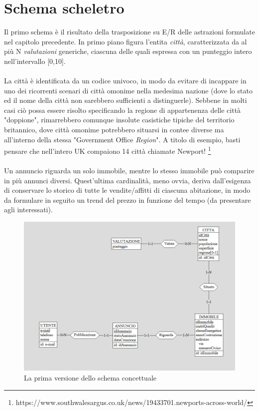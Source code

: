 \documentclass[a4paper,12pt]{report}
\begin{document}
        \section{Schema scheletro}
        Il primo schema è il risultato della trasposizione su E/R delle astrazioni formulate nel capitolo precedente.
        In primo piano figura l'entita \textit{città}, caratterizzata da al più N \textit{valutazioni} generiche,
        ciascuna delle quali espressa con un punteggio intero nell'intervallo [0,10]. \\
        \\
        La città è identificata da un codice univoco, in modo da evitare di incappare in uno dei ricorrenti scenari di 
        città omonime nella medesima nazione (dove lo stato ed il nome della città non sarebbero sufficienti a distinguerle). Sebbene in molti casi ciò possa essere risolto specificando la regione di appartenenza 
        delle città "doppione", rimarrebbero comunque insolute casistiche tipiche del territorio britannico, dove città omonime 
        potrebbero situarsi in contee diverse ma all'interno della stessa "Government Office \textit{Region}". A titolo di esempio, basti
        pensare che nell'intero UK compaiono 14 città chiamate Newport! \footnote{https://www.southwalesargus.co.uk/news/19433701.newports-across-world/} \\
        \\
        Un annuncio riguarda un solo immobile, mentre lo stesso immobile può comparire in più annunci diversi. Quest'ultima cardinalità,
        meno ovvia, deriva dall'esigenza di conservare lo storico di tutte le vendite/affitti di ciascuna abitazione, in modo da formulare
        in seguito un trend del prezzo in funzione del tempo (da presentare agli interessati).

        \begin{figure}[ht]
            \centering{}
            \includegraphics[width=\linewidth]{./images/first.png}
            \caption{La prima versione dello schema concettuale}
        \end{figure}
\end{document}
